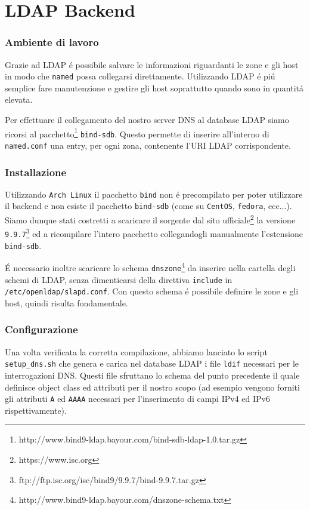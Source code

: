 \documentclass[9pt, a4paper, oneside]{article}
\begin{document}
	\part{LDAP Backend}
		\section{Ambiente di lavoro}
			\par
				Grazie ad LDAP \'e possibile salvare le 
				informazioni riguardanti le zone e gli host in 
				modo che \texttt{named} possa collegarsi 
				direttamente.
				Utilizzando LDAP \'e pi\'u semplice fare 
				manutenzione e gestire gli host soprattutto 
				quando sono in quantit\'a elevata.
			\par
				Per effettuare il collegamento del nostro 
				server DNS al database LDAP siamo ricorsi al 
				pacchetto\footnote{http://www.bind9-ldap.bayour.com/bind-sdb-ldap-1.0.tar.gz} 
				\texttt{bind-sdb}. Questo 
				permette di inserire all'interno di 
				\texttt{named.conf} una entry, per ogni 
				zona, contenente l'URI LDAP corrispondente.
		\section{Installazione}
			\par
				Utilizzando \texttt{Arch Linux} il pacchetto 
				\texttt{bind} non \'e precompilato per poter 
				utilizzare il backend e non esiste il 
				pacchetto \texttt{bind-sdb} (come su 
				\texttt{CentOS}, \texttt{fedora}, ecc...). 
				Siamo dunque stati costretti a scaricare il 
				sorgente dal sito 
				ufficiale\footnote{https://www.isc.org} 
				la versione 
				\texttt{9.9.7}\footnote{ftp://ftp.isc.org/isc/bind9/9.9.7/bind-9.9.7.tar.gz} 
				ed a ricompilare l'intero pacchetto 
				collegandogli manualmente l'estensione 
				\texttt{bind-sdb}.
			\par
				\'E necessario inoltre scaricare lo schema 
				\texttt{dnszone}\footnote{http://www.bind9-ldap.bayour.com/dnszone-schema.txt} 
				da inserire nella cartella degli schemi di 
				LDAP, senza dimenticarsi della direttiva 
				\texttt{include} in 
				\texttt{/etc/openldap/slapd.conf}. Con 
				questo schema \'e possibile definire le zone 
				e gli host, quindi risulta fondamentale.
		\section{Configurazione}
			\par
				Una volta verificata la corretta compilazione, 
				abbiamo lanciato lo script 
				\texttt{setup\_dns.sh} che genera e carica nel 
				database LDAP i file \texttt{ldif} necessari 
				per le interrogazioni DNS. Questi file 
				sfruttano lo schema del punto precedente
				il quale definisce object class ed attributi per 
				il nostro scopo (ad esempio vengono forniti 
				gli attributi \texttt{A} ed \texttt{AAAA} 
				necessari per l'inserimento di campi IPv4 ed 
				IPv6 rispettivamente).
			\newpage
\end{document}
